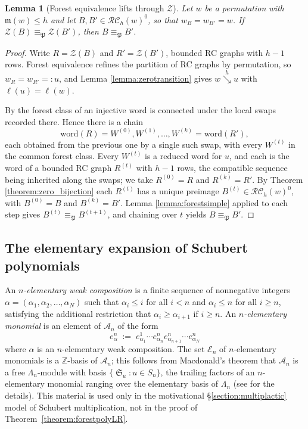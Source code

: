 \documentclass{amsart}
\newtheorem{lemma}{Lemma}[subsection]
\theoremstyle{definition}
\theoremstyle{remark}
\numberwithin{equation}{subsection}
\DeclareMathOperator{\sch}{\mathfrak{S}}
\newcommand{\downvar}[1]{\stackrel{#1}{\searrow}}
\newcommand{\wof}[1]{w_{#1}}
\newcommand{\zeromap}{\mathcal{Z}}
\newcommand{\RC}{\mathcal{RC}}
\newcommand{\coma}{\mathcal{A}}
\newcommand{\forest}{\mathfrak{P}}
\newcommand{\maxd}{\mathfrak{m}}
\begin{document}
\begin{lemma}[Forest equivalence lifts through $\zeromap$]\label{lemma:forestlift}
Let $w$ be a permutation with $\maxd(w)\leq h$ and let $B,B'\in\RC_h(w)^0$, so that $\wof B=\wof{B'}=w$. If $\zeromap(B)\equiv_\forest\zeromap(B')$, then $B\equiv_\forest B'$.
\end{lemma}
\begin{proof}
Write $R=\zeromap(B)$ and $R'=\zeromap(B')$, bounded RC graphs with $h-1$ rows. Forest equivalence refines the partition of RC graphs by permutation, so $\wof R=\wof{R'}=:u$, and Lemma \ref{lemma:zerotransition} gives $w\downvar{h}u$ with $\ell(u)=\ell(w)$.

By \cite[Proposition~5.8]{nadeau2024forest} the forest class of an injective word is connected under the local swaps recorded there. Hence there is a chain
$$\mathrm{word}(R)=W^{(0)},W^{(1)},\ldots,W^{(k)}=\mathrm{word}(R'),$$
each obtained from the previous one by a single such swap, with every $W^{(t)}$ in the common forest class. Every $W^{(t)}$ is a reduced word for $u$, and each is the word of a bounded RC graph $R^{(t)}$ with $h-1$ rows, the compatible sequence being inherited along the swaps; we take $R^{(0)}=R$ and $R^{(k)}=R'$. By Theorem \ref{theorem:zero_bijection} each $R^{(t)}$ has a unique preimage $B^{(t)}\in\RC_h(w)^0$, with $B^{(0)}=B$ and $B^{(k)}=B'$. Lemma \ref{lemma:forestsimple} applied to each step gives $B^{(t)}\equiv_\forest B^{(t+1)}$, and chaining over $t$ yields $B\equiv_\forest B'$.
\end{proof}

\subsection{The elementary expansion of Schubert polynomials}

An \emph{$n$-elementary weak composition} is a finite sequence of nonnegative integers $\alpha=(\alpha_1,\alpha_2,\ldots,\alpha_N)$ such that $\alpha_i\leq i$ for all $i<n$ and $\alpha_i\leq n$ for all $i\geq n$, satisfying the additional restriction that $\alpha_i\geq \alpha_{i+1}$ if $i\geq n$. An \emph{$n$-elementary monomial} is an element of $\coma_n$ of the form
$$e_{\alpha}^n \;:=\; e_{\alpha_1}^{1}\cdots e_{\alpha_n}^ne_{\alpha_{n+1}}^n\cdots e_{\alpha_N}^n$$
where $\alpha$ is an $n$-elementary weak composition. The set $\mathcal{E}_n$ of $n$-elementary monomials is a $\mathbb{Z}$-basis of $\coma_n$; this follows from Macdonald's theorem that $\coma_n$ is a free $\Lambda_n$-module with basis $\{\sch_u : u\in S_n\}$, the trailing factors of an $n$-elementary monomial ranging over the elementary basis of $\Lambda_n$ (see \cite{companionbialgebra} for the details). This material is used only in the motivational \S\ref{section:multiplactic} model of Schubert multiplication, not in the proof of Theorem~\ref{theorem:forestpolyLR}.
\end{document}
